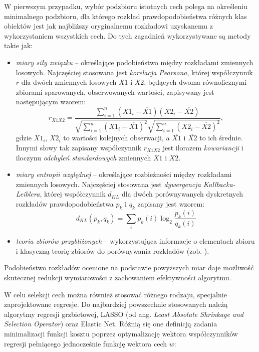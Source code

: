 W pierwszym przypadku, wybór podzbioru istotnych cech polega na określeniu minimalnego podzbioru, dla którego rozkład prawdopodobieństwa różnych klas obiektów jest jak najbliższy oryginalnemu rozkładowi uzyskanemu z wykorzystaniem wszystkich cech. Do tych zagadnień wykorzystywane są metody takie jak:
\begin{itemize}[noitemsep,nolistsep]
	\item \textit{miary siły związku} -- określające podobieństwo między rozkładami zmiennych losowych. Najczęściej stosowana jest \textit{korelacja Pearsona}, której współczynnik $r$ dla dwóch zmiennych losowych $X1$ i $X2$, będących dwoma równolicznymi zbiorami sparowanych, obserwowanych wartości, zapisywany jest następującym wzorem:
	\begin{equation}
	\label{PearsorR}
	r_{X1X2} = \frac{\sum_{i=1}^n (X1_i - \overline{X1})(X2_i - \overline{X2})}{\sqrt{\sum_{i=1}^n (X1_i - \overline{X1})^2} \sqrt{\sum_{i=1}^n (X2_i - \overline{X2})^2}},
	\end{equation}
	gdzie $X1_i$, $X2_i$ to wartości kolejnych obserwacji, a $\overline{X1}$ i $\overline{X2}$ to ich średnie. Innymi słowy tak zapisany współczynnik $r_{X1X2}$ jest ilorazem \textit{kowariancji} \linebreak i iloczynu \textit{odchyleń standardowych} zmiennych $X1$ i $X2$.
	\item \textit{miary entropii względnej} --  określające rozbieżności między rozkładami zmiennych losowych. Najczęściej stosowana jest \textit{dywergencja Kullbacka-Leiblera}, której współczynnik $d_{KL}$ dla dwóch porównywanych dyskretnych rozkładów prawdopodobieństwa $p_k$ i $q_k$ zapisany jest wzorem: 
	\begin{equation}
	d_{KL}(p_k, q_k) = \sum_{i} p_k(i) \log_2 \frac{p_k(i)}{q_k(i)}
	\end{equation}
	\item \textit{teoria zbiorów przybliżonych} -- wykorzystująca informacje o elementach zbioru i klasyczną teorię zbiorów do porównywania rozkładów (zob. \cite{Kowalik2003}).
\end{itemize}
Podobieństwo rozkładów ocenione na podstawie powyższych miar daje możliwość skutecznej redukcji wymiarowości z zachowaniem efektywności algorytmu.

W celu selekcji cech można również stosować różnego rodzaju, specjalnie zaprojektowane regresje. Do najbardziej powszechnie stosowanych należą algorytmy regresji grzbietowej, LASSO (od ang. \textit{Least Absolute Shrinkage and Selection Operator}) oraz Elastic Net. Różnią się one definicją zadania minimalizacji funkcji kosztu poprzez optymalizację wektora współczynników regresji pełniącego jednocześnie funkcję wektora cech $w$:  

